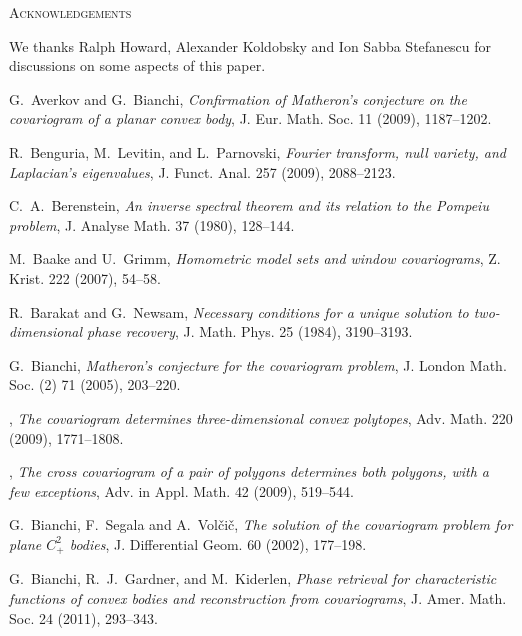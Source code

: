 \documentclass[a4paper]{amsart}
\theoremstyle{definition}
\numberwithin{equation}{section}
\begin{document}
\begin{center}
\textsc{Acknowledgements}
\end{center}

We thanks Ralph Howard, Alexander Koldobsky and Ion Sabba Stefanescu  for discussions on some aspects of this paper.


\begin{thebibliography}{Bia09a}
\footnotesize

 G.~Averkov and G.~Bianchi, \emph{Confirmation of {M}atheron's conjecture on the covariogram of a planar convex body}, J. Eur. Math. Soc. {11} (2009), 1187--1202.

 R.~Benguria, M.~Levitin, and L.~Parnovski, \emph{Fourier transform, null variety, and Laplacian's eigenvalues}, J. Funct. Anal. {257} (2009), 2088--2123.

 C.~A.~Berenstein, \emph{An inverse spectral theorem and its relation to the Pompeiu problem}, J. Analyse Math. {37} (1980), 128--144.

 M.~Baake and U.~Grimm, \emph{Homometric model sets and window covariograms}, Z. Krist. {222} (2007), 54--58.

  R.~Barakat and G.~Newsam, \emph{Necessary conditions for a unique solution to two-dimensional phase recovery}, J. Math. Phys. 25 (1984), 3190--3193.

 G.~Bianchi, \emph{Matheron's conjecture for the covariogram problem}, J. London Math. Soc. (2) {71} (2005), 203--220.

 \bysame, \emph{The covariogram determines three-dimensional convex polytopes}, Adv. Math. {220} (2009), 1771--1808.
 
 \bysame, \emph{The cross covariogram of a pair of polygons determines both polygons, with a few exceptions}, Adv. in Appl. Math. {42} (2009), 519--544.
 
 G.~Bianchi, F.~Segala and A.~Vol\v{c}i\v{c}, \emph{The solution of the covariogram problem for plane $C^2_+$ bodies}, J. Differential Geom. {60} (2002), 177--198.

 G.~Bianchi, R.~J.~Gardner, and M.~Kiderlen, \emph{Phase retrieval for characteristic functions of convex bodies and reconstruction from covariograms}, J. Amer. Math. Soc. {24} (2011), 293--343.


\end{thebibliography}
\end{document}
